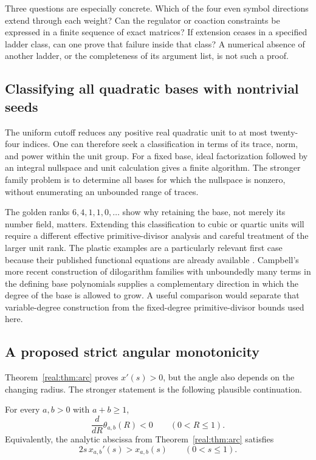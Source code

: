 Three questions are especially concrete. Which of the four even
symbol directions extend through each weight? Can the regulator or
coaction constraints be expressed in a finite sequence of exact
matrices? If extension ceases in a specified ladder class, can one
prove that failure inside that class? A numerical absence of another
ladder, or the completeness of its argument list, is not such a proof.

\subsection{Classifying all quadratic bases with nontrivial seeds}
The uniform cutoff reduces any positive real quadratic unit to at
most twenty-four indices. One can therefore seek a classification in
terms of its trace, norm, and power within the unit group. For a fixed
base, ideal factorization followed by an integral nullspace and unit
calculation gives a finite algorithm. The stronger family problem is
to determine all bases for which the nullspace is nonzero, without
enumerating an unbounded range of traces.

The golden ranks \(6,4,1,1,0,\ldots\) show why retaining the base, not
merely its number field, matters. Extending this classification to
cubic or quartic units will require a different effective
primitive-divisor analysis and careful treatment of the larger unit
rank. The plastic examples are a particularly relevant first case
because their published functional equations are already available
\cite{AbouzahraLewinXiao1987}.
Campbell's more recent construction of dilogarithm families with
unboundedly many terms in the defining base polynomials
\cite{Campbell2024} supplies a complementary direction in which the
degree of the base is allowed to grow. A useful comparison would
separate that variable-degree construction from the fixed-degree
primitive-divisor bounds used here.

\subsection{A proposed strict angular monotonicity}
Theorem~\ref{real:thm:arc} proves \(x'(s)>0\), but the angle also
depends on the changing radius. The stronger statement is the
following plausible continuation.

\begin{conjecture}
\label{future:conj:angle}
For every \(a,b>0\) with \(a+b\ge1\),
\[
 \frac{d}{dR}\theta_{a,b}(R)<0
 \qquad(0<R\le1).
\]
Equivalently, the analytic abscissa from
Theorem~\ref{real:thm:arc} satisfies
\[
 2s\,x_{a,b}'(s)>x_{a,b}(s)\qquad(0<s\le1).
\]
\end{conjecture}

